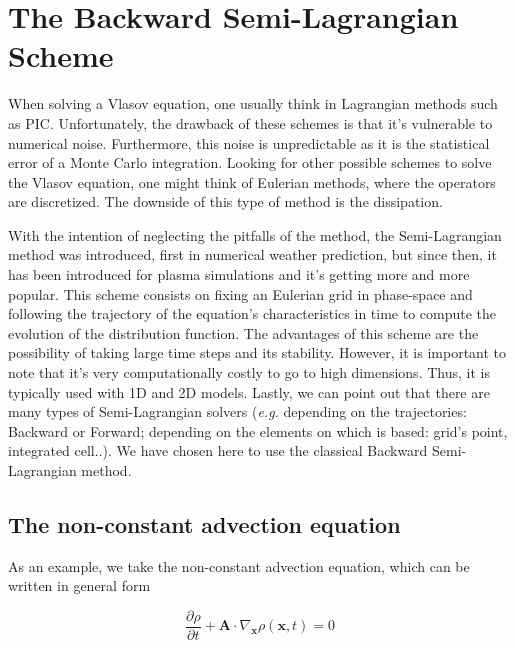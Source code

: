 \documentclass[proc]{edpsmath}
\begin{document}
\section{The Backward Semi-Lagrangian Scheme}
\label{sec:BSL_scheme}

When solving a Vlasov equation, one usually think in Lagrangian methods such as PIC\cite{Birdsall:1985:PPV:577251}. Unfortunately, the drawback of these schemes is that it's vulnerable to numerical noise. Furthermore, this noise is unpredictable as it is the statistical error of a Monte Carlo integration. Looking for other possible schemes to solve the Vlasov equation, one might think of Eulerian methods, where the operators 
are discretized. The downside of this type of method is the dissipation.

With the intention of neglecting the pitfalls of the method, the Semi-Lagrangian method was introduced, first in numerical weather prediction, but since then, it has been introduced for plasma simulations \cite{sonnendrucker:inria-00073296, Cheng1976330} and it's getting more and more popular. This scheme consists on fixing an Eulerian grid in phase-space and following the trajectory of the equation's characteristics in time to compute the evolution of the distribution function. The advantages of this scheme are the possibility of taking large time steps and its stability. However, it is important to note that it's very computationally costly to go to high dimensions. Thus, it is typically used with 1D and 2D models. Lastly, we can point out that there are many types of Semi-Lagrangian solvers (\emph{e.g.} depending on the trajectories: Backward or Forward;  depending on the elements on which is based: grid's point, integrated cell..). We have chosen here to use the classical Backward Semi-Lagrangian method. 

\subsection{The non-constant advection equation}

As an example, we take the non-constant advection equation, which can be written in general form

\begin{equation}
	\dfrac{\partial \rho}{\partial t} + \mathbf{A} \cdot \nabla_{\mathbf{x}} \rho(\mathbf{x}, t)  = 0
	\label{eqn:noncst_advec}
\end{equation}
\end{document}

